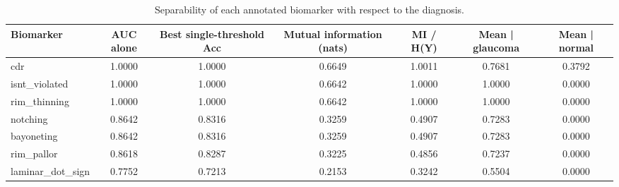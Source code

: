 \begin{table}[t]
\centering
\caption{Separability of each annotated biomarker with respect to the diagnosis.}
\label{tab:separability}
\begin{tabular}{lcccccc}
\toprule
Biomarker & AUC alone & Best single-threshold Acc & Mutual information (nats) & MI / H(Y) & Mean | glaucoma & Mean | normal \\
\midrule
cdr & 1.0000 & 1.0000 & 0.6649 & 1.0011 & 0.7681 & 0.3792 \\
isnt\_violated & 1.0000 & 1.0000 & 0.6642 & 1.0000 & 1.0000 & 0.0000 \\
rim\_thinning & 1.0000 & 1.0000 & 0.6642 & 1.0000 & 1.0000 & 0.0000 \\
notching & 0.8642 & 0.8316 & 0.3259 & 0.4907 & 0.7283 & 0.0000 \\
bayoneting & 0.8642 & 0.8316 & 0.3259 & 0.4907 & 0.7283 & 0.0000 \\
rim\_pallor & 0.8618 & 0.8287 & 0.3225 & 0.4856 & 0.7237 & 0.0000 \\
laminar\_dot\_sign & 0.7752 & 0.7213 & 0.2153 & 0.3242 & 0.5504 & 0.0000 \\
\bottomrule
\end{tabular}
\end{table}